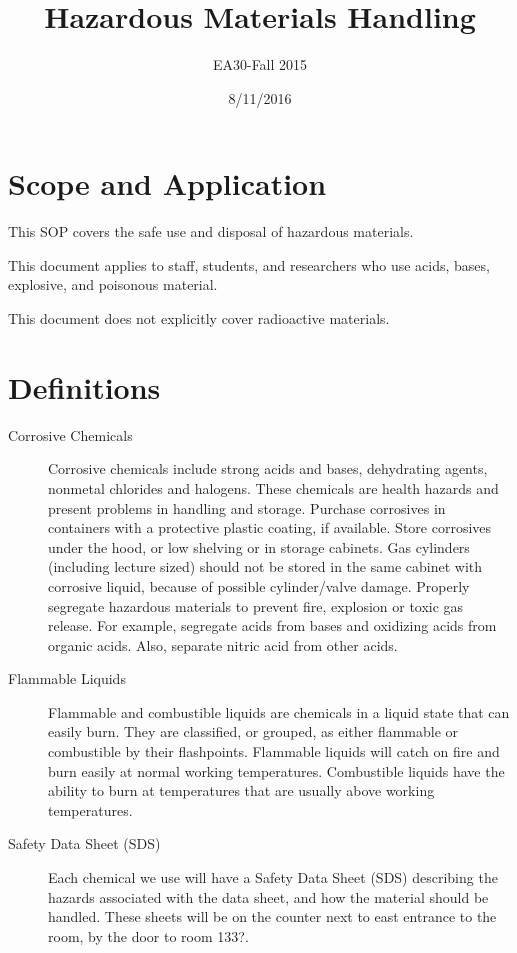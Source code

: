 \documentclass[12pt]{../SOP3_beta}\usepackage[]{graphicx}\usepackage[]{color}
\title{Hazardous Materials Handling}
\date{8/11/2016}
\author{EA30-Fall 2015}
\begin{document}
\maketitle

\section{Scope and Application}

\NP This SOP covers the safe use and disposal of hazardous materials.

\NP This document applies to staff, students, and researchers who use acids, bases, explosive, and poisonous material.  

\NP This document does not explicitly cover radioactive materials. 

\tableofcontents

\newpage

\section{Definitions}

\begin{description}

  \item[Corrosive Chemicals] Corrosive chemicals include strong acids and bases, dehydrating agents, nonmetal chlorides and halogens. These chemicals are health hazards and present problems in handling and storage. Purchase corrosives in containers with a protective plastic coating, if available.  Store corrosives under the hood, or low shelving or in storage cabinets. Gas cylinders (including lecture sized) should not be stored in the same cabinet with corrosive liquid, because of possible cylinder/valve damage.  Properly segregate hazardous materials to prevent fire, explosion or toxic gas release. For example, segregate acids from bases and oxidizing acids from organic acids. Also, separate nitric acid from other acids. 

\item[Flammable Liquids] Flammable and combustible liquids are chemicals in a liquid state that can easily burn. They are classified, or grouped, as either flammable or combustible by their flashpoints. Flammable liquids will catch on fire and burn easily at normal working temperatures. Combustible liquids have the ability to burn at temperatures that are usually above working temperatures.

\item[Safety Data Sheet (SDS)] Each chemical we use will have a Safety Data Sheet (SDS) describing the hazards associated with the data sheet, and how the material should be handled. These sheets will be on the counter next to east entrance to the room, by the door to room 133?.

\end{description}
\end{document}
